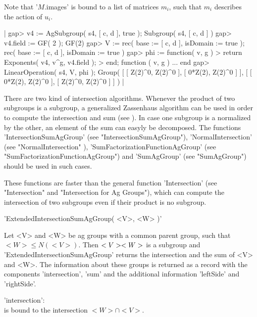 Note that '$M$.images'  is bound to a  list  of matrices $m_i$, such that
$m_i$ describes the action of $u_i$.

|    gap> v4 := AgSubgroup( s4, [ c, d ], true );
    Subgroup( s4, [ c, d ] )
    gap> v4.field := GF( 2 );
    GF(2)
    gap> V := rec( base := [ c, d ], isDomain := true );
    rec(
      base := [ c, d ],
      isDomain := true )
    gap> phi := function( v, g )
    >      return Exponents( v4, v^g, v4.field );
    >    end;
    function ( v, g ) ... end
    gap> LinearOperation( s4, V, phi );
    Group( [ [ Z(2)^0, Z(2)^0 ], [ 0*Z(2), Z(2)^0 ] ],
    [ [ 0*Z(2), Z(2)^0 ], [ Z(2)^0, Z(2)^0 ] ] ) |



There are two kind of intersection  algorithms.   Whenever the product of
two subgroups is a  subgroup, a generalized  Zassenhaus algorithm  can be
used in order to compute the intersection and sum  (see \cite{GS90}).  In
case one subgroup is a normalized by the other, an element of the sum can
easyly   be decomposed.    The  functions 'IntersectionSumAgGroup'   (see
"IntersectionSumAgGroup"), 'NormalIntersection' (see "NormalIntersection"
),                     'SumFactorizationFunctionAgGroup'             (see
"SumFactorizationFunctionAgGroup")  and  'SumAgGroup'  (see "SumAgGroup")
should be used in such cases.

These functions are faster than the  general function 'Intersection' (see
"Intersection"  and "Intersection for Ag  Groups"), which can compute the
intersection of two subgroups even if their product is no subgroup.


'ExtendedIntersectionSumAgGroup( <V>, <W> )'

Let <V> and <W> be ag groups  with a common  parent group, such that $<W>
\leq     N(<V>)$.    Then   $<V>  \*      <W>$     is   a  subgroup   and
'ExtendedIntersectionSumAgGroup' returns  the intersection and the sum of
<V> and <W>.  The information about these groups  is returned as a record
with the components 'intersection', 'sum'  and the additional information
'leftSide' and 'rightSide'.

'intersection': \\
        is bound to the intersection $<W> \cap <V>$.

